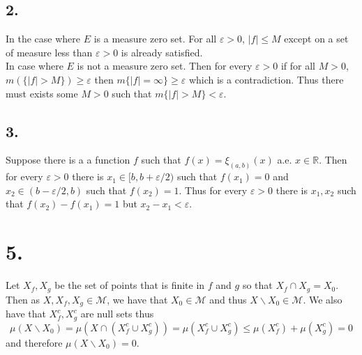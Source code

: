 \documentclass[11pt]{article}
\theoremstyle{mystyle}
\theoremstyle{definition}
\begin{document}
\subsection*{2.}
In the case where $E$ is a measure zero set. For all $\varepsilon > 0 $, $|f|\le M$ except on a set of measure less than $\varepsilon >0$ is already satisfied. \\ 
In case where $E$ is not a measure zero set. Then for every $\varepsilon > 0$ if for all $M>0$, $m(\{|f|>M\}) \ge \varepsilon$ then $m\{|f|=\infty\} \ge \varepsilon$ which is a contradiction. Thus there must exists some $M>0$ such that $m\{|f| >M\} < \varepsilon$.  
\subsection*{3.}
Suppose there is a a function $f$ such that $f(x) = \xi_{(a,b)}(x)$ a.e. $x \in \mathbb{R}$. Then for every $\varepsilon >0$ there is $x_1 \in [b, b+\varepsilon/2)$ such that $f(x_1) = 0$ and $x_2 \in (b-\varepsilon/2, b)$ such that $f(x_2) = 1$. Thus for every $\varepsilon>0$ there is $x_1, x_2$ such that $f(x_2) - f(x_1) = 1$ but $x_2 - x_1 < \varepsilon$.
\newpage
\section*{5.}
Let $X_f, X_g$ be the set of points that is finite in $f$ and $g$ so that $X_f \cap X_g = X_0$. Then as $X, X_f, X_g \in \mathcal{M}$, we have that $X_0 \in \mathcal{M}$ and thus $X \backslash X_0 \in \mathcal{M}$. We also have that $X_f^c, X_g^c$ are null sets thus  
\[ 
  \mu(X \backslash X_0) = \mu(X \cap (X_f^c \cup X_g^c)) = \mu(X_f^c \cup X_g^c) \le \mu(X_f^c) + \mu(X_g^c) = 0 
\]
and therefore $\mu(X \backslash X_0) = 0$. 
\end{document}
